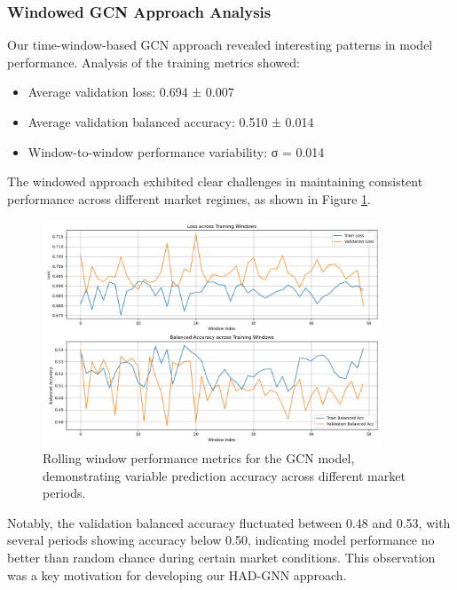 \documentclass[12pt]{article}
\begin{document}
\subsubsection{Windowed GCN Approach Analysis}

Our time-window-based GCN approach revealed interesting patterns in model performance. Analysis of the training metrics showed:

\begin{itemize}
    \item Average validation loss: 0.694 ± 0.007
    \item Average validation balanced accuracy: 0.510 ± 0.014
    \item Window-to-window performance variability: σ = 0.014
\end{itemize}

The windowed approach exhibited clear challenges in maintaining consistent performance across different market regimes, as shown in Figure \ref{fig:rolling_performance}.

\begin{figure}[h]
    \centering
    \includegraphics[width=0.9\textwidth]{../models/gcn/rolling_window_performance.png}
    \caption{Rolling window performance metrics for the GCN model, demonstrating variable prediction accuracy across different market periods.}
    \label{fig:rolling_performance}
\end{figure}

Notably, the validation balanced accuracy fluctuated between 0.48 and 0.53, with several periods showing accuracy below 0.50, indicating model performance no better than random chance during certain market conditions. This observation was a key motivation for developing our HAD-GNN approach.
\end{document}
